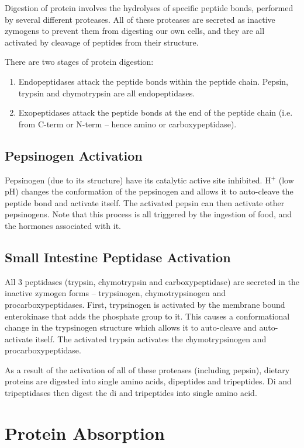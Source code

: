 Digestion of protein involves the hydrolyses of specific peptide bonds, performed by several different proteases.
All of these proteases are secreted as inactive zymogens to prevent them from digesting our own cells, and they are all activated by cleavage of peptides from their structure.

There are two stages of protein digestion:
\begin{enumerate}
\item Endopeptidases attack the peptide bonds within the peptide chain. Pepsin, trypsin and chymotrypsin are all endopeptidases.
\item Exopeptidases attack the peptide bonds at the end of the peptide chain (i.e. from C-term or N-term -- hence amino or carboxypeptidase).
\end{enumerate}

\subsection{Pepsinogen Activation}

Pepsinogen (due to its structure) have its catalytic active site inhibited.
H$^+$ (low pH) changes the conformation of the pepsinogen and allows it to auto-cleave the peptide bond and activate itself.
The activated pepsin can then activate other pepsinogens.
Note that this process is all triggered by the ingestion of food, and the hormones associated with it.

\subsection{Small Intestine Peptidase Activation}

All 3 peptidases (trypsin, chymotrypsin and carboxypeptidase) are secreted in the inactive zymogen forms -- trypsinogen, chymotrypsinogen and procarboxypeptidases.
First, trypsinogen is activated by the membrane bound enterokinase that adds the phosphate group to it.
This causes a conformational change in the trypsinogen structure which allows it to auto-cleave and auto-activate itself.
The activated trypsin activates the chymotrypsinogen and procarboxypeptidase.

As a result of the activation of all of these proteases (including pepsin), dietary proteins are digested into single amino acids, dipeptides and tripeptides.
Di and tripeptidases then digest the di and tripeptides into single amino acid.

\section{Protein Absorption}

